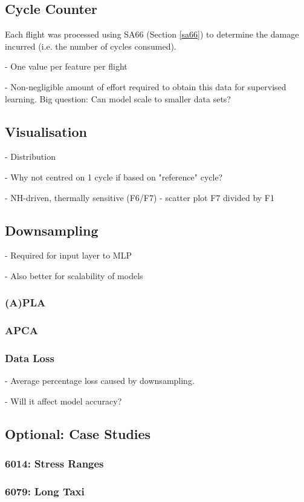 \subsection{Cycle Counter}
Each flight was processed using SA66 (Section \ref{sa66}) to determine the damage incurred (i.e. the number of cycles consumed).

- One value per feature per flight

- Non-negligible amount of effort required to obtain this data for supervised learning. Big question: Can model scale to smaller data sets?

\subsection{Visualisation}
- Distribution

- Why not centred on 1 cycle if based on "reference" cycle?

- NH-driven, thermally sensitive (F6/F7) - scatter plot F7 divided by F1

\subsection{Downsampling}
- Required for input layer to MLP

- Also better for scalability of models

\subsubsection{(A)PLA}

\subsubsection{APCA}

\subsubsection{Data Loss}
- Average percentage loss caused by downsampling.

- Will it affect model accuracy?

\subsection{Optional: Case Studies}

\subsubsection{6014: Stress Ranges}

\subsubsection{6079: Long Taxi}